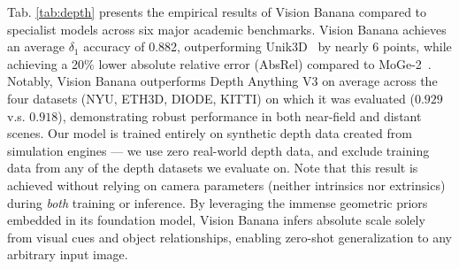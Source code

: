 \documentclass[11pt, a4paper, copyright, gdm]{google}
\begin{document}
Tab. \ref{tab:depth} presents the empirical results of Vision Banana compared to specialist models across six major academic benchmarks. Vision Banana achieves an average $\delta_1$ accuracy of 0.882, outperforming Unik3D~\citep{unik3d} by nearly 6 points, while achieving a 20\% lower absolute relative error (AbsRel) compared to MoGe-2~\citep{wang2025moge2}. 
Notably, Vision Banana outperforms Depth Anything V3 \citep{dav3} on average across the four datasets (NYU, ETH3D, DIODE, KITTI) on which it was evaluated ($0.929$ v.s. $0.918$), demonstrating robust performance in both near-field and distant scenes.
Our model is trained entirely on synthetic depth data created from simulation engines --- we use zero real-world depth data, and exclude training data from any of the depth datasets we evaluate on.
Note that this result is achieved without relying on camera parameters (neither intrinsics nor extrinsics) during \emph{both} training or inference. 
By leveraging the immense geometric priors embedded in its foundation model, Vision Banana infers absolute scale solely from visual cues and object relationships, enabling zero-shot generalization to any arbitrary input image.
\end{document}
